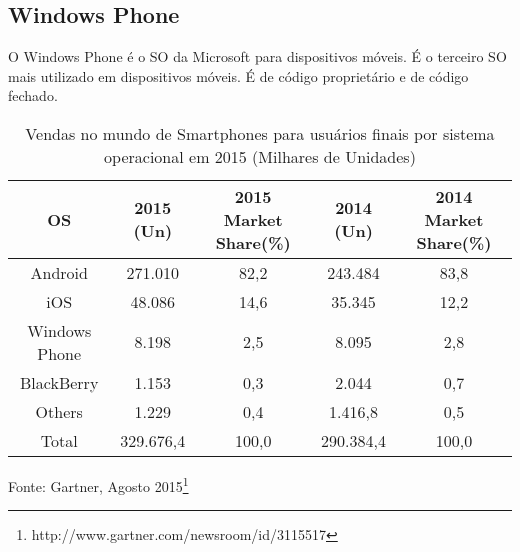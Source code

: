 \subsection{Windows Phone}
O Windows Phone é o SO da Microsoft para dispositivos móveis. É o terceiro SO mais utilizado em dispositivos móveis. É de código proprietário e de código fechado.

\begin{table}[!htb]
	\centering
	\caption[Sistemas operacionais mais utilizados]{Vendas no mundo de Smartphones para usuários finais por sistema operacional em 2015 (Milhares de Unidades)}
	\label{tab:OS}
	\begin{tabular}{c|c|c|c|c}
		\hline \SPACE
		\textbf{OS} & \textbf{2015 (Un)}  & \textbf{2015 Market Share(\%)}  & \textbf{2014 (Un)}  & \textbf{2014 Market Share(\%)} \\ \hline \SPACE
		Android & 271.010 & 82,2 & 243.484 & 83,8\\ \hline \SPACE
		iOS & 48.086 & 14,6 & 35.345 & 12,2\\ \hline \SPACE
		Windows Phone & 8.198 & 2,5 & 8.095 & 2,8\\ \hline \SPACE
		BlackBerry & 1.153 & 0,3 & 2.044 & 0,7\\ \hline \SPACE
		Others & 1.229 & 0,4 & 1.416,8 & 0,5\\ \hline \SPACE
		Total & 329.676,4 & 100,0 & 290.384,4 & 100,0\\
		\hline
	\end{tabular}
\end{table}\vspace{-1cm}
\begin{center}\small{Fonte: Gartner, Agosto 2015\footnote{http://www.gartner.com/newsroom/id/3115517}}
\end{center}